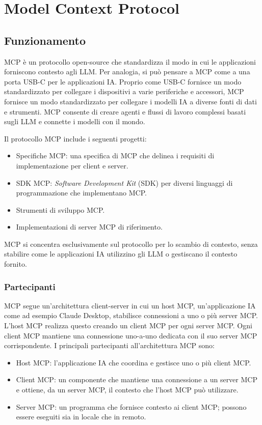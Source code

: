 \chapter{Model Context Protocol}

\section{Funzionamento}

MCP è un protocollo open-source che standardizza il modo in cui le applicazioni forniscono contesto agli LLM. Per analogia, si può pensare a MCP 
come a una porta USB-C per le applicazioni IA. Proprio come USB-C fornisce un modo standardizzato per collegare i dispositivi a varie periferiche 
e accessori, MCP fornisce un modo standardizzato per collegare i modelli IA a diverse fonti di dati e strumenti. MCP consente di creare agenti e 
flussi di lavoro complessi basati sugli LLM e connette i modelli con il mondo. 
\cite{modelcontextprotocol2024intro}

Il protocollo MCP include i seguenti progetti:
\begin{itemize}
\item Specifiche MCP: una specifica di MCP che delinea i requisiti di implementazione per client e server.
\item SDK MCP: \textit{Software Development Kit} (SDK) per diversi linguaggi di programmazione che implementano MCP.
\item Strumenti di sviluppo MCP.
\item Implementazioni di server MCP di riferimento.
\end{itemize}
MCP si concentra esclusivamente sul protocollo per lo scambio di contesto, senza stabilire come le applicazioni IA utilizzino gli LLM o gestiscano il contesto fornito.
\cite{modelcontextprotocol2024arch}

\subsection{Partecipanti}
MCP segue un'architettura client-server in cui un host MCP, un'applicazione IA come ad esempio Claude Desktop, stabilisce connessioni a uno o più server MCP. L'host MCP realizza questo creando un client MCP per ogni server MCP. Ogni client MCP mantiene una connessione uno-a-uno dedicata con il suo server MCP corrispondente.
I principali partecipanti all'architettura MCP sono:
\begin{itemize}
\item Host MCP: l'applicazione IA che coordina e gestisce uno o più client MCP.
\item Client MCP: un componente che mantiene una connessione a un server MCP e ottiene, da un server MCP, il contesto che l'host MCP può utilizzare.
\item Server MCP: un programma che fornisce contesto ai client MCP; possono essere eseguiti sia in locale che in remoto.
\cite{modelcontextprotocol2024arch}
\end{itemize}

